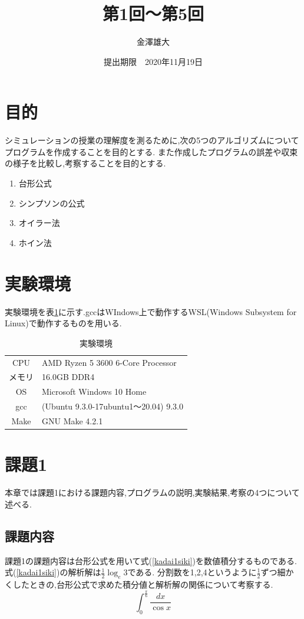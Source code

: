 \documentclass[dvipdfmx]{jarticle}
\title{第1回～第5回}
\date{提出期限　2020年11月19日}
\author{金澤雄大}
\begin{document}
    \maketitle
    \thispagestyle{empty}
    \clearpage
    \addtocounter{page}{-1}
    \section{目的}
    シミュレーションの授業の理解度を測るために,次の5つのアルゴリズムについてプログラムを作成することを目的とする.
    また作成したプログラムの誤差や収束の様子を比較し,考察することを目的とする.
  \begin{enumerate}
  \item 台形公式
  \item シンプソンの公式
  \item オイラー法
  \item ホイン法
  \end{enumerate}
  
    \section{実験環境}
      実験環境を表\ref{env}に示す.gccはWIndows上で動作するWSL(Windows Subsystem for Linux)で動作するものを用いる.
      \begin{table}[H]
        \caption{実験環境}
      \label{env}
      \begin{center}
          \begin{tabular}{c|l}\hline
            CPU & AMD Ryzen 5 3600 6-Core Processor \\ 
            メモリ & 16.0GB DDR4 \\
            OS & Microsoft Windows 10 Home \\
            gcc & (Ubuntu 9.3.0-17ubuntu1～20.04) 9.3.0 \\
            Make & GNU Make 4.2.1 \\ \hline
          \end{tabular}
      \end{center}
      \end{table}

    \section{課題1}
    本章では課題1における課題内容,プログラムの説明,実験結果,考察の4つについて述べる.
    \subsection{課題内容}
    課題1の課題内容は台形公式を用いて式(\ref{kadai1siki})を数値積分するものである.式(\ref{kadai1siki})の解析解は$\frac{1}{2} \log_{e} 3$である.
    分割数を1,2,4というように$\frac{1}{2}$ずつ細かくしたときの,台形公式で求めた積分値と解析解の関係について考察する.
    \begin{equation}
  \int_0^\frac{\pi}{6} \frac{dx}{\cos x}
      \label{kadai1siki}
    \end{equation}
\end{document}
